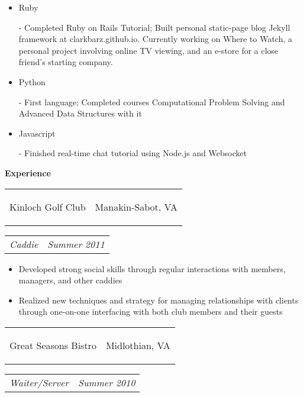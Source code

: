 \documentclass[11pt]{article}
\makeatletter
\newcommand{\headerrow}[2]
{\begin{tabular*}{\linewidth}{l@{\extracolsep{\fill}}r}
	#1 &
	#2 \\
\end{tabular*}}
\makeatother
\begin{document}
\begin{itemize}
	\item \begin{bf}Ruby\end{bf} - Completed Ruby on Rails Tutorial; Built personal static-page blog Jekyll framework at clarkbarz.github.io. Currently working on Where to Watch, a personal project involving online TV viewing, and an e-store for a close friend's starting company.
	\vspace{-0.5em}
	\item \begin{bf}Python\end{bf} - First language; Completed courses Computational Problem Solving and Advanced Data Structures with it
	\vspace{-0.5em}
	\item \begin{bf}Javascript\end{bf} - Finished real-time chat tutorial using Node.js and Websocket
\end{itemize}

\vspace{-0.5em}
\begin{LARGE}
	\bf Experience
\end{LARGE}

\vspace{0.5em}

\headerrow
	{\begin{Large}Kinloch Golf Club\end{Large}}
	{Manakin-Sabot, VA}
\headerrow
	{\textit{Caddie}}
	{\textit{Summer 2011}}
	
\vspace{-1.0em}
\begin{itemize}
	\item Developed strong social skills through regular interactions with members, managers, and other caddies
	\vspace{-0.5em}
	\item Realized new techniques and strategy for managing relationships with clients through one-on-one interfacing with both club members and their guests 
\end{itemize}

\vspace{-0.5em}

\headerrow
	{\begin{Large}Great Seasons Bistro\end{Large}}
	{Midlothian, VA}
\headerrow
	{\textit{Waiter/Server}}
	{\textit{Summer 2010}}
	
\end{document}
